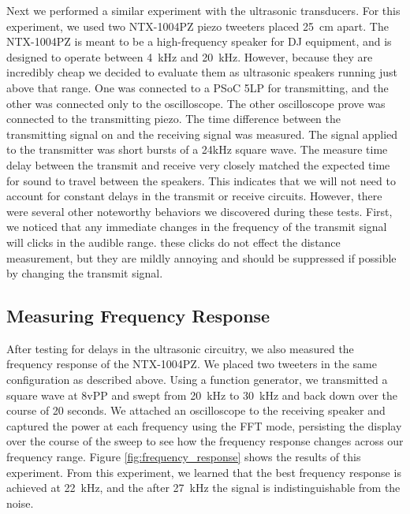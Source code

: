 \documentclass{article}
\begin{document}
      Next we performed a similar experiment with the ultrasonic transducers. For this experiment, we used two NTX-1004PZ piezo tweeters placed \SI{25}{\centi\meter} apart. The NTX-1004PZ is meant to be a high-frequency speaker for DJ equipment, and is designed to operate between \SI{4}{\kilo\hertz} and \SI{20}{\kilo\hertz}. However, because they are incredibly cheap we decided to evaluate them as ultrasonic speakers running just above that range. One was connected to a PSoC 5LP for transmitting, and the other was connected only to the oscilloscope. The other oscilloscope prove was connected to the transmitting piezo. The time difference between the transmitting signal on and the receiving signal was measured. The signal applied to the transmitter was short bursts of a 24kHz square wave. The measure time delay between the transmit and receive very closely matched the expected time for sound to travel between the speakers. This indicates that we will not need to account for constant delays in the transmit or receive circuits. However, there were several other noteworthy behaviors we discovered during these tests. First, we noticed that any immediate changes in the frequency of the transmit signal will clicks in the audible range. these clicks do not effect the distance measurement, but they are mildly annoying and should be suppressed if possible by changing the transmit signal.

  \subsection{Measuring Frequency Response}

      After testing for delays in the ultrasonic circuitry, we also measured the frequency response of the NTX-1004PZ. We placed two tweeters in the same configuration as described above. Using a function generator, we transmitted a square wave at 8vPP and swept from \SI{20}{\kilo\hertz} to \SI{30}{\kilo\hertz} and back down over the course of 20 seconds. We attached an oscilloscope to the receiving speaker and captured the power at each frequency using the FFT mode, persisting the display over the course of the sweep to see how the frequency response changes across our frequency range. Figure \ref{fig:frequency_response} shows the results of this experiment. From this experiment, we learned that the best frequency response is achieved at \SI{22}{\kilo\hertz}, and the after \SI{27}{\kilo\hertz} the signal is indistinguishable from the noise.
\end{document}
